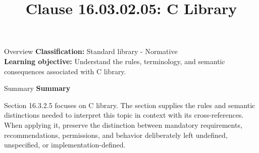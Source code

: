 \documentclass[10pt,letterpaper]{article}
\title{Clause 16.03.02.05: C Library}
\author{}
\date{}
\begin{document}
\maketitle
\begin{CornellOverviewBox}{Overview}
\textbf{Classification:} Standard library - Normative\\[2pt]
\textbf{Learning objective:} Understand the rules, terminology, and semantic consequences associated with C library.
\end{CornellOverviewBox}\begin{CornellSummaryBox}{Summary}
{\sffamily\bfseries\color{Accent} Summary}\par\vspace{3pt}Section 16.3.2.5 focuses on C library. The section supplies the rules and semantic distinctions needed to interpret this topic in context with its cross-references. When applying it, preserve the distinction between mandatory requirements, recommendations, permissions, and behavior deliberately left undefined, unspecified, or implementation-defined.
\end{CornellSummaryBox}
\end{document}
